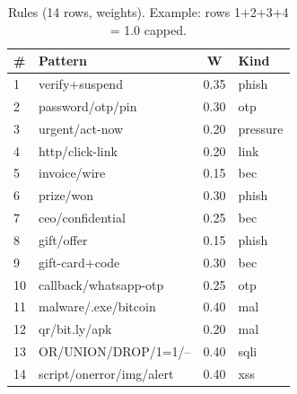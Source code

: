 \documentclass[11pt,a4paper]{article}
\begin{document}
\begin{table}[h]\centering\caption{Rules (14 rows, weights). Example: rows 1+2+3+4 = 1.0 capped.}\label{tab:rules}\begin{tabular}{@{}llcl@{}}\toprule \# & Pattern & W & Kind\\\midrule
1 & verify+suspend & 0.35 & phish\\ 2 & password/otp/pin & 0.30 & otp\\ 3 & urgent/act-now & 0.20 & pressure\\ 4 & http/click-link & 0.20 & link\\ 5 & invoice/wire & 0.15 & bec\\ 6 & prize/won & 0.30 & phish\\ 7 & ceo/confidential & 0.25 & bec\\ 8 & gift/offer & 0.15 & phish\\ 9 & gift-card+code & 0.30 & bec\\ 10 & callback/whatsapp-otp & 0.25 & otp\\ 11 & malware/.exe/bitcoin & 0.40 & mal\\ 12 & qr/bit.ly/apk & 0.20 & mal\\ 13 & OR/UNION/DROP/1=1/-- & 0.40 & sqli\\ 14 & script/onerror/img/alert & 0.40 & xss\\\bottomrule\end{tabular}\end{table}
\end{document}
